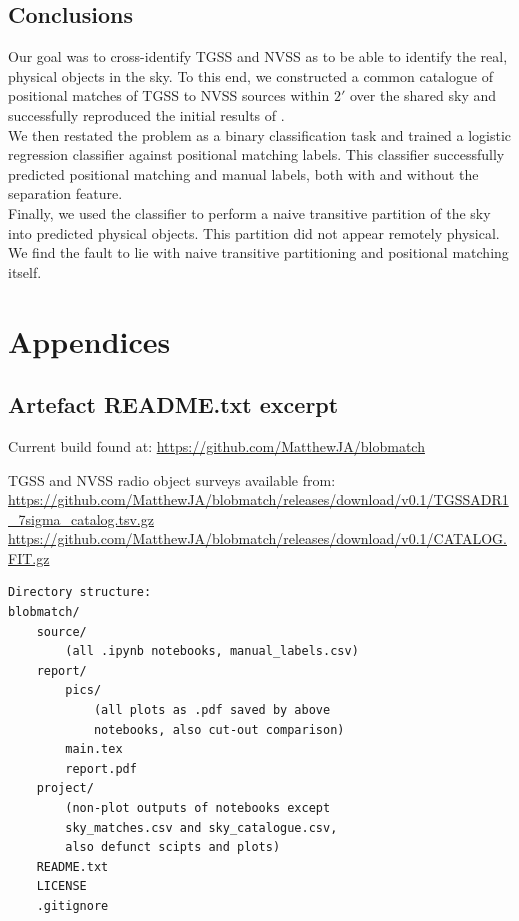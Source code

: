 \documentclass[12pt,a4paper]{article}
\begin{document}
\bigskip
\subsection{Conclusions}
Our goal was to cross-identify TGSS and NVSS as to be able to identify the real, physical objects in the sky. To this end, we constructed a common catalogue of positional matches of TGSS to NVSS sources within $\ang{;2;}$ over the shared sky and successfully reproduced the initial results of \citet{posmatchpaper}.\\

We then restated the problem as a binary classification task and trained a logistic regression classifier against positional matching labels. This classifier successfully predicted positional matching and manual labels, both with and without the separation feature.\\

Finally, we used the classifier to perform a naive transitive partition of the sky into predicted physical objects. This partition did not appear remotely physical. We find the fault to lie with naive transitive partitioning and positional matching itself.

\bigskip
\nocite{*}



\newpage
\section{Appendices}
\subsection{Artefact README.txt excerpt}
\label{app:artefact}
Current build found at:
\url{https://github.com/MatthewJA/blobmatch}

TGSS and NVSS radio object surveys available from:\\
\url{https://github.com/MatthewJA/blobmatch/releases/download/v0.1/TGSSADR1_7sigma_catalog.tsv.gz}\\
\url{https://github.com/MatthewJA/blobmatch/releases/download/v0.1/CATALOG.FIT.gz}

\begin{verbatim}
Directory structure:
blobmatch/
    source/
        (all .ipynb notebooks, manual_labels.csv)
    report/
        pics/
            (all plots as .pdf saved by above
            notebooks, also cut-out comparison)
        main.tex
        report.pdf
    project/
        (non-plot outputs of notebooks except
        sky_matches.csv and sky_catalogue.csv,
        also defunct scipts and plots)
    README.txt
    LICENSE
    .gitignore
\end{verbatim}
\end{document}
